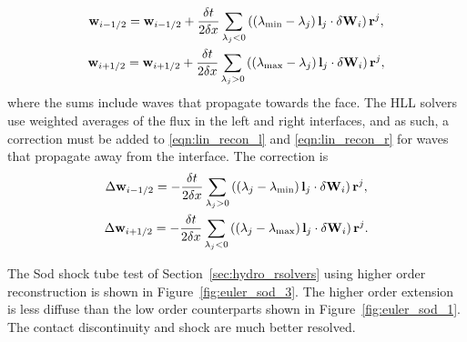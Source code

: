 \begin{gather}
\label{eqn:lin_recon_l}
\mathbf{w}_{i-1/2} = \mathbf{w}_{i-1/2} + \frac{\delta t}{2\delta x} \sum_{\lambda_j < 0} 
                 \left(\left(\lambda_{\min} - \lambda_j\right) \mathbf{l}_j 
                 \cdot \mathbf{\delta} \mathbf{W}_i\right) \mathbf{r}^j, \\
\label{eqn:lin_recon_r}
\mathbf{w}_{i+1/2} = \mathbf{w}_{i+1/2} + \frac{\delta t}{2\delta x} \sum_{\lambda_j > 0} 
                 \left(\left(\lambda_{\max} - \lambda_j\right) \mathbf{l}_j 
                 \cdot \mathbf{\delta} \mathbf{W}_i\right) \mathbf{r}^j, 
\end{gather}
where the sums include waves that propagate towards the face.  The HLL solvers use weighted averages of the flux in the left and right interfaces, and as such, a correction must be added to \eqref{eqn:lin_recon_l} and \eqref{eqn:lin_recon_r} for waves that propagate away from the interface.  The correction is \citep{Colella:1984}
\begin{gather}
\Delta \mathbf{w}_{i-1/2} = -\frac{\delta t}{2\delta x} \sum_{\lambda_j > 0} 
                 \left(\left(\lambda_j - \lambda_{\min}\right) \mathbf{l}_j 
                 \cdot \mathbf{\delta} \mathbf{W}_i\right) \mathbf{r}^j, \\
\Delta \mathbf{w}_{i+1/2} = -\frac{\delta t}{2\delta x} \sum_{\lambda_j < 0} 
                 \left(\left(\lambda_j - \lambda_{\max}\right) \mathbf{l}_j 
                 \cdot \mathbf{\delta} \mathbf{W}_i\right) \mathbf{r}^j. 
\end{gather}

The Sod shock tube test of Section~\ref{sec:hydro_rsolvers} using higher order reconstruction is shown in Figure~\ref{fig:euler_sod_3}.  The higher order extension is less diffuse than the low order counterparts shown in Figure~\ref{fig:euler_sod_1}.  The contact discontinuity and shock are much better resolved.

